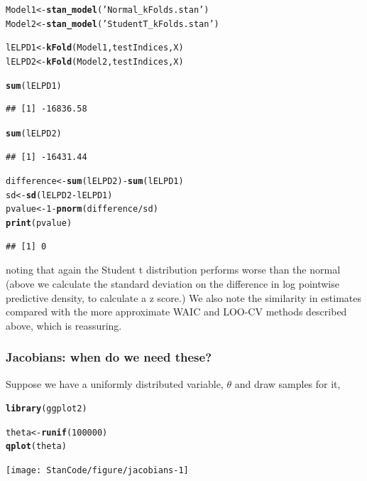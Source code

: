 \documentclass[11pt,fullpage]{book}
\makeatletter
\newenvironment{kframe}{%
	\def\at@end@of@kframe{}%
	\ifinner\ifhmode%
	\def\at@end@of@kframe{\end{minipage}}%
\begin{minipage}{\columnwidth}%
	\fi\fi%
	\def\FrameCommand##1{\hskip\@totalleftmargin \hskip-\fboxsep
		\colorbox{shadecolor}{##1}\hskip-\fboxsep
		\hskip-\linewidth \hskip-\@totalleftmargin \hskip\columnwidth}%
	\MakeFramed {\advance\hsize-\width
		\@totalleftmargin\z@ \linewidth\hsize
		\@setminipage}}%
{\par\unskip\endMakeFramed%
	\at@end@of@kframe}
\newcommand{\hlnum}[1]{\textcolor[rgb]{0.686,0.059,0.569}{#1}}%
\newcommand{\hlstr}[1]{\textcolor[rgb]{0.192,0.494,0.8}{#1}}%
\newcommand{\hlopt}[1]{\textcolor[rgb]{0,0,0}{#1}}%
\newcommand{\hlstd}[1]{\textcolor[rgb]{0.345,0.345,0.345}{#1}}%
\newcommand{\hlkwb}[1]{\textcolor[rgb]{0.69,0.353,0.396}{#1}}%
\newcommand{\hlkwd}[1]{\textcolor[rgb]{0.737,0.353,0.396}{\textbf{#1}}}%
\newenvironment{knitrout}{}{} %
\makeatother
\begin{document}
\begin{knitrout}\small
		\color{fgcolor}\begin{kframe}
\begin{alltt}
\hlstd{Model1} \hlkwb{<-} \hlkwd{stan_model}\hlstd{(}\hlstr{'Normal_kFolds.stan'}\hlstd{)}
\hlstd{Model2} \hlkwb{<-} \hlkwd{stan_model}\hlstd{(}\hlstr{'StudentT_kFolds.stan'}\hlstd{)}

\hlstd{lELPD1} \hlkwb{<-} \hlkwd{kFold}\hlstd{(Model1,testIndices,X)}
\hlstd{lELPD2} \hlkwb{<-} \hlkwd{kFold}\hlstd{(Model2,testIndices,X)}
\end{alltt}

\begin{alltt}
\hlkwd{sum}\hlstd{(lELPD1)}
\end{alltt}
\begin{verbatim}
## [1] -16836.58
\end{verbatim}
\begin{alltt}
\hlkwd{sum}\hlstd{(lELPD2)}
\end{alltt}
\begin{verbatim}
## [1] -16431.44
\end{verbatim}
\begin{alltt}
\hlstd{difference} \hlkwb{<-} \hlkwd{sum}\hlstd{(lELPD2)} \hlopt{-} \hlkwd{sum}\hlstd{(lELPD1)}
\hlstd{sd} \hlkwb{<-} \hlkwd{sd}\hlstd{(lELPD2} \hlopt{-} \hlstd{lELPD1)}
\hlstd{pvalue} \hlkwb{<-} 1- \hlkwd{pnorm}\hlstd{(difference}\hlopt{/}\hlstd{sd)}
\hlkwd{print}\hlstd{(pvalue)}
\end{alltt}
\begin{verbatim}
## [1] 0
\end{verbatim}
		\end{kframe}
	\end{knitrout}


noting that again the Student t distribution performs worse than the normal (above we calculate the standard deviation on the difference in log pointwise predictive density, to calculate a z score.) We also note the similarity in estimates compared with the more approximate WAIC and LOO-CV methods described above, which is reassuring.

\subsubsection{Jacobians: when do we need these?}
Suppose we have a uniformly distributed variable, $\theta$ and draw samples for it,

\begin{knitrout}
\color{fgcolor}\begin{kframe}
\begin{alltt}
\hlkwd{library}\hlstd{(ggplot2)}

\hlstd{theta} \hlkwb{<-} \hlkwd{runif}\hlstd{(}\hlnum{100000}\hlstd{)}
\hlkwd{qplot}\hlstd{(theta)}
\end{alltt}
\end{kframe}
\texttt{[image: StanCode/figure/jacobians-1]} 
\end{knitrout}
\end{document}
